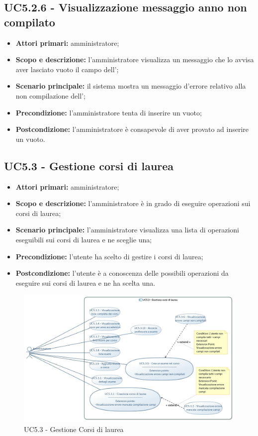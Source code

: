 \documentclass[AnalisiDeiRequisiti.tex]{subfiles}
\begin{document}
\subsection{UC5.2.6 - Visualizzazione messaggio anno non compilato}
\begin{itemize}
	\item \textbf{Attori primari:} amministratore;
	\item \textbf{Scopo e descrizione:} l'amministratore visualizza un messaggio che lo avvisa aver lasciato vuoto il campo dell';
	\item \textbf{Scenario principale:} il sistema mostra un messaggio d'errore relativo alla non compilazione dell';
	\item \textbf{Precondizione:} l'amministratore tenta di inserire un  vuoto; 
	\item \textbf{Postcondizione:} l'amministratore è consapevole di aver provato ad inserire un  vuoto.
\end{itemize}
\subsection{UC5.3 - Gestione corsi di laurea}
\begin{itemize}
	\item \textbf{Attori primari:} amministratore;
	\item \textbf{Scopo e descrizione:} l'amministratore è in grado di eseguire operazioni sui corsi di laurea;
	\item \textbf{Scenario principale:} l'amministratore visualizza una lista di operazioni eseguibili sui corsi di laurea e ne sceglie una;
	\item \textbf{Precondizione:} l'utente ha scelto di gestire i corsi di laurea; 
	\item \textbf{Postcondizione:} l'utente è a conoscenza delle possibili operazioni da eseguire sui corsi di laurea e ne ha scelta una.
\end{itemize}

\begin{figure}[H]
	\centering
	\includegraphics[width=1.0\linewidth]{UC5_3.jpg}
	\caption{UC5.3 - Gestione Corsi di laurea}
	\label{fig:UC5.3 - Gestione Corsi di laurea}
\end{figure}
\end{document}

